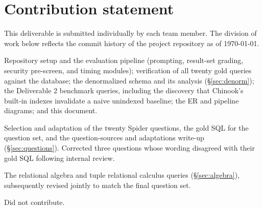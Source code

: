 \documentclass[11pt]{article}
\begin{document}
\begin{center}
\end{center}

\section{Contribution statement}\label{sec:contrib}

This deliverable is submitted individually by each team member. The division of work below
reflects the commit history of the project repository as of \today.

\begin{description}[leftmargin=*,style=nextline,topsep=2pt,itemsep=3pt]
  \item[Jelani Denmark] Repository setup and the evaluation pipeline (prompting, result-set
    grading, security pre-screen, and timing modules); verification of all twenty gold queries
    against the database; the denormalized schema and its analysis (\S\ref{sec:denorm}); the
    Deliverable 2 benchmark queries, including the discovery that Chinook's built-in indexes
    invalidate a naive unindexed baseline; the ER and pipeline diagrams; and this document.
  \item[Joshua Sanders] Selection and adaptation of the twenty Spider questions, the gold SQL
    for the question set, and the question-sources and adaptations write-up
    (\S\ref{sec:questions}). Corrected three questions whose wording disagreed with their gold
    SQL following internal review.
  \item[Isaiah Washington] The relational algebra and tuple relational calculus queries
    (\S\ref{sec:algebra}), subsequently revised jointly to match the final question set.
  \item[Maxwell Amakor] Did not contribute.
\end{description}
\end{document}

